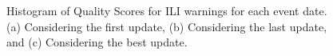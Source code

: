 \begin{figure}[tb!]
  
  

  \caption{\label{ref:ili_hist:compare} Histogram of Quality Scores for ILI warnings 
  for each event date. (a) Considering the first update, (b) Considering the last update, 
  and (c) Considering the best update.}
\end{figure}



